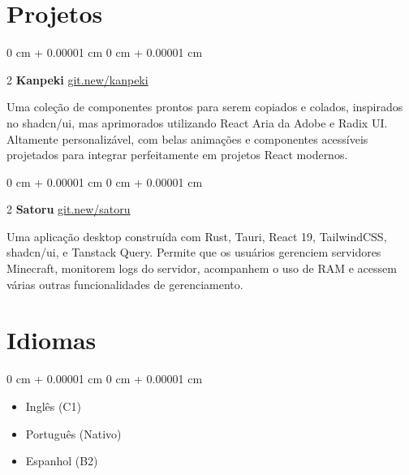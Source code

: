 \documentclass[10pt, letterpaper]{article}
\newenvironment{highlights}{ \begin{itemize}[ topsep=0.10 cm, parsep=0.10 cm, partopsep=0pt,
itemsep=0pt, leftmargin=0 cm + 10pt ] }{ \end{itemize} } %
\newenvironment{onecolentry}{ \begin{adjustwidth}{ 0 cm + 0.00001 cm }{ 0 cm + 0.00001 cm }
}{ \end{adjustwidth} } %
\newenvironment{twocolentry}[2][]{ \onecolentry \def\secondColumn{#2} \setcolumnwidth{\fill, 4.5 cm}
\begin{paracol}{2} }{ \switchcolumn \raggedleft \secondColumn \end{paracol}
\endonecolentry } %
\begin{document}
	\section{Projetos}
	
	\begin{twocolentry}
		{\href{https://git.new/kanpeki}{git.new/kanpeki}} \textbf{Kanpeki}
	\end{twocolentry}
	
	\vspace{0.10cm}
	Uma coleção de componentes prontos para serem copiados e colados, inspirados no shadcn/ui, mas aprimorados utilizando
	React Aria da Adobe e Radix UI. Altamente personalizável, com belas
	animações e componentes acessíveis projetados para integrar perfeitamente em
	projetos React modernos.
	
	\vspace{0.2cm}
	
	\begin{twocolentry}
		{\href{https://git.new/satoru}{git.new/satoru}} \textbf{Satoru}
	\end{twocolentry}
	
	\vspace{0.10cm}
	Uma aplicação desktop construída com Rust, Tauri, React 19, TailwindCSS, shadcn/ui,
	e Tanstack Query. Permite que os usuários gerenciem servidores Minecraft, monitorem logs do servidor,
	acompanhem o uso de RAM e acessem várias outras funcionalidades de gerenciamento.
	
	\section{Idiomas}
	
	\begin{onecolentry}
		\begin{highlights}
			\item Inglês (C1)
			\item Português (Nativo)
			\item Espanhol (B2)
		\end{highlights}
	\end{onecolentry}
	
\end{document}

